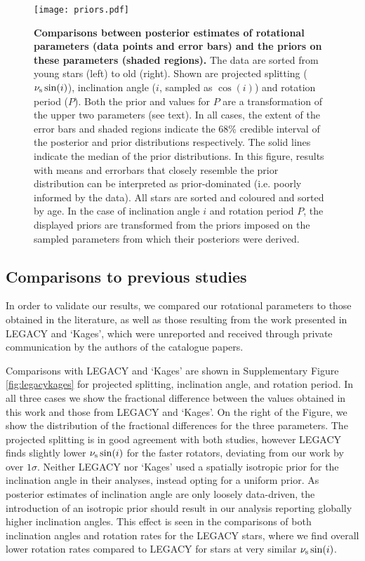 \begin{figure}
	\centering
	\texttt{[image: priors.pdf]}
	\caption{\textbf{Comparisons between posterior estimates of rotational parameters (data points and error bars) and the priors on these parameters (shaded regions).} The data are sorted from young stars (left) to old (right). Shown are projected splitting ($\nu_{\rm s}\sin(i)$), inclination angle ($i$, sampled as $\cos(i)$) and rotation period ($P$). Both the prior and values for $P$ are a transformation of the upper two parameters (see text). In all cases, the extent of the error bars and shaded regions indicate the 68\% credible interval of the posterior and prior distributions respectively. The solid lines indicate the median of the prior distributions. In this figure, results with means and errorbars that closely resemble the prior distribution can be interpreted as prior-dominated (i.e. poorly informed by the data). All stars are sorted and coloured and sorted by age. In the case of inclination angle $i$ and rotation period $P$, the displayed priors are transformed from the priors imposed on the sampled parameters from which their posteriors were derived.}
	\label{fig:priors}
\end{figure}

\subsection{Comparisons to previous studies}\label{ssec:litcomp}
In order to validate our results, we compared our rotational parameters to those obtained in the literature, as well as those resulting from the work presented in LEGACY and `Kages', which were unreported and received through private communication by the authors of the catalogue papers.

Comparisons with LEGACY and `Kages' are shown in Supplementary Figure \ref{fig:legacykages} for projected splitting, inclination angle, and rotation period. In all three cases we show the fractional difference between the values obtained in this work and those from LEGACY and `Kages'. On the right of the Figure, we show the distribution of the fractional differences for the three parameters.
The projected splitting is in good agreement with both studies, however LEGACY finds slightly lower $\nu_{\rm s}\sin(i)$ for the faster rotators, deviating from our work by over $1\sigma$. Neither LEGACY nor `Kages' used a spatially isotropic prior for the inclination angle in their analyses, instead opting for a uniform prior. As posterior estimates of inclination angle are only loosely data-driven, the introduction of an isotropic prior should result in our analysis reporting globally higher inclination angles. This effect is seen in the comparisons of both inclination angles and rotation rates for the LEGACY stars, where we find overall lower rotation rates compared to LEGACY for stars at very similar $\nu_{\rm s}\sin(i)$.

